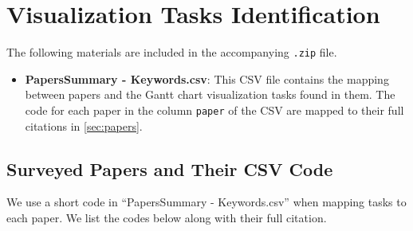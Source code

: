 
\chapter{Visualization Tasks Identification}
\label{chap:appa}

\begin{refsection}
The following materials are included in the accompanying \texttt{.zip} file.
\begin{itemize}
    \item \textbf{PapersSummary - Keywords.csv}: This CSV file contains the mapping between papers and the Gantt chart visualization tasks found in them. The code for each paper in the column \texttt{paper} of the CSV are mapped to their full citations in \autoref{sec:papers}.
\end{itemize}

\section{Surveyed Papers and Their CSV Code}
\label{sec:papers}
We use a short code in ``PapersSummary - Keywords.csv'' when mapping tasks to each paper. We list the codes below along with their full citation.


\end{refsection}
